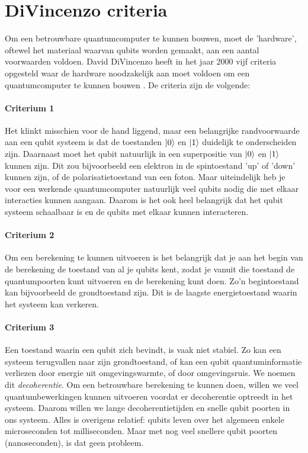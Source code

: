 \documentclass[../../main.tex]{subfiles}
\begin{document}
\section{DiVincenzo criteria}\label{sec:divincenzo}
Om een betrouwbare quantumcomputer te kunnen bouwen, moet de 'hardware', oftewel het materiaal waarvan qubits worden gemaakt, aan een aantal voorwaarden voldoen. David DiVincenzo heeft in het jaar 2000 vijf criteria opgesteld waar de hardware noodzakelijk aan moet voldoen om een quantumcomputer te kunnen bouwen  \cite{divincenzo2000physical}. De criteria zijn de volgende:

\paragraph*{Criterium 1}
Het klinkt misschien voor de hand liggend, maar een belangrijke randvoorwaarde aan een qubit systeem is dat de toestanden $\ket{0}$ en $\ket{1}$ duidelijk te onderscheiden zijn. Daarnaast moet het qubit natuurlijk in een superpositie van $\ket{0}$ en $\ket{1}$ kunnen zijn. Dit zou bijvoorbeeld een elektron in de spintoestand 'up' of 'down' kunnen zijn, of de polarisatietoestand van een foton. Maar uiteindelijk heb je voor een werkende quantumcomputer natuurlijk veel qubits nodig die met elkaar interacties kunnen aangaan. Daarom is het ook heel belangrijk dat het qubit systeem schaalbaar is en de qubits met elkaar kunnen interacteren.
\paragraph*{Criterium 2}
Om een berekening te kunnen uitvoeren is het belangrijk dat je aan het begin van de berekening de toestand van al je qubits kent, zodat je vanuit die toestand de quantumpoorten kunt uitvoeren en de berekening kunt doen. Zo'n begintoestand kan bijvoorbeeld de grondtoestand zijn. Dit is de laagste energietoestand waarin het systeem kan verkeren. 

\paragraph*{Criterium 3}
Een toestand waarin een qubit zich bevindt, is vaak niet stabiel. Zo kan een systeem terugvallen naar zijn grondtoestand, of kan een qubit quantuminformatie verliezen door energie uit omgevingswarmte, of door omgevingsruis. We noemen dit \textit{decoherentie}. Om een betrouwbare berekening te kunnen doen, willen we veel quantumbewerkingen kunnen uitvoeren voordat er decoherentie optreedt in het systeem. Daarom willen we lange decoherentietijden en snelle qubit poorten in ons systeem. Alles is overigens relatief: qubits leven over het algemeen enkele microseconden tot milliseconden. Maar met nog veel snellere qubit poorten (nanoseconden), is dat geen probleem. 
\end{document}
